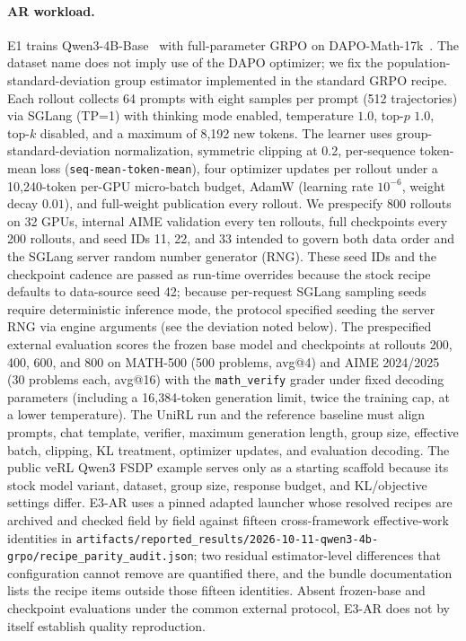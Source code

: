 \documentclass[10pt]{article}
\newcommand{\codepath}[1]{\texttt{#1}}
\begin{document}
\paragraph{AR workload.}
E1 trains Qwen3-4B-Base~\citep{yang2025qwen3} with full-parameter GRPO on DAPO-Math-17k~\citep{yu2025dapo}.
The dataset name does not imply use of the DAPO optimizer; we fix the population-standard-deviation group estimator implemented in the standard GRPO recipe.
Each rollout collects 64 prompts with eight samples per prompt (512 trajectories) via SGLang (TP=1) with thinking mode enabled, temperature $1.0$, top-$p$ $1.0$, top-$k$ disabled, and a maximum of 8,192 new tokens.
The learner uses group-standard-deviation normalization, symmetric clipping at 0.2, per-sequence token-mean loss (\texttt{seq-mean-token-mean}), four optimizer updates per rollout under a 10,240-token per-GPU micro-batch budget, AdamW (learning rate $10^{-6}$, weight decay $0.01$), and full-weight publication every rollout.
We prespecify 800 rollouts on 32 GPUs, internal AIME validation every ten rollouts, full checkpoints every 200 rollouts, and seed IDs 11, 22, and 33 intended to govern both data order and the SGLang server random number generator (RNG).
These seed IDs and the checkpoint cadence are passed as run-time overrides because the stock recipe defaults to data-source seed 42; because per-request SGLang sampling seeds require deterministic inference mode, the protocol specified seeding the server RNG via engine arguments (see the deviation noted below).
The prespecified external evaluation scores the frozen base model and checkpoints at rollouts 200, 400, 600, and 800 on MATH-500 (500 problems, avg@4) and AIME 2024/2025 (30 problems each, avg@16) with the \texttt{math\_verify} grader under fixed decoding parameters (including a 16,384-token generation limit, twice the training cap, at a lower temperature).
The UniRL run and the reference baseline must align prompts, chat template, verifier, maximum generation length, group size, effective batch, clipping, KL treatment, optimizer updates, and evaluation decoding.
The public veRL Qwen3 FSDP example serves only as a starting scaffold because its stock model variant, dataset, group size, response budget, and KL/objective settings differ.
E3-AR uses a pinned adapted launcher whose resolved recipes are archived and checked field by field against fifteen cross-framework effective-work identities in \codepath{artifacts/reported\_results/2026-10-11-qwen3-4b-grpo/recipe\_parity\_audit.json}; two residual estimator-level differences that configuration cannot remove are quantified there, and the bundle documentation lists the recipe items outside those fifteen identities. Absent frozen-base and checkpoint evaluations under the common external protocol, E3-AR does not by itself establish quality reproduction.
\end{document}
